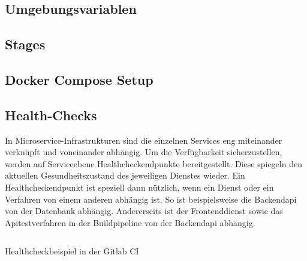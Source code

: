\subsection{Umgebungsvariablen}
\label{subsec:umgebungsvariablen}

\subsection{Stages}
\label{subsec:stages}


\subsection{Docker Compose Setup}
\label{subsec:dockercomposesetup}

\subsection{Health-Checks}
\label{subsec:healthcheck}
In Microservice-Infrastrukturen sind die einzelnen Services eng miteinander verknüpft
und voneinander abhängig. Um die Verfügbarkeit sicherzustellen, werden auf
Serviceebene Healthcheckendpunkte bereitgestellt. Diese spiegeln den aktuellen
Gesundheitszustand des jeweiligen Dienstes wieder. Ein Healthcheckendpunkt
ist speziell dann nützlich, wenn ein Dienst oder ein Verfahren von einem anderen
abhängig ist. So ist beispielsweise die Backendapi von der Datenbank
abhängig. Andererseits ist der Frontenddienst sowie das Apitestverfahren
in der Buildpipeline von der Backendapi abhängig. 

\begin{listing}
    \label{lst:healthcheck}
    \inputminted{sh}{snippets/sh/healthcheck.sh}
    \caption{Healthcheckbeispiel in der Gitlab CI}
\end{listing}

